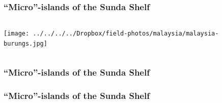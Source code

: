 \begin{frame}
    \frametitle{``Micro''-islands of the Sunda Shelf}
    \vspace{-2mm}
    \begin{columns}
        \column{\dimexpr\paperwidth}
        \texttt{[image: ../../../../Dropbox/field-photos/malaysia/malaysia-burungs.jpg]}
    \end{columns}
\end{frame}

{
\begin{frame}
    \frametitle{``Micro''-islands of the Sunda Shelf}
\end{frame}
}

{
\begin{frame}
    \frametitle{``Micro''-islands of the Sunda Shelf}
\end{frame}
}


